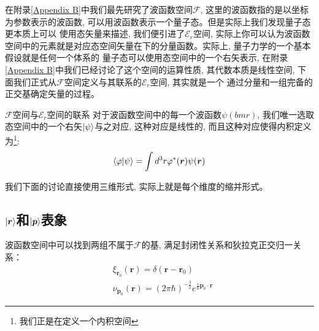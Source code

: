\documentclass[a4paper,zihao=-4,linespread=1]{ctexrep}
\begin{document}
    在附录\ref{Appendix B}中我们最先研究了波函数空间$\mathscr{F}$, 这里的波函数指的是以坐标为参数表示的波函数, 可以用波函数表示一个量子态。但是实际上我们发现量子态更本质上可以
    使用态矢量来描述, 我们便引进了$\mathscr{E}_r$空间, 实际上你可以认为波函数空间中的元素就是对应态空间矢量在下的分量函数。实际上, 量子力学的一个基本假设就是任何一个体系的
    量子态可以使用态空间中的一个右矢表示, 在附录\ref{Appendix B}中我们已经讨论了这个空间的运算性质, 其代数本质是线性空间, 下面我们正式从$\mathscr{F}$空间定义与其联系的$\mathscr {E}_r$空间, 其实就是一个
    通过分量和一组完备的正交基确定矢量的过程。
    \begin{proposition}{$\mathscr{F}$空间与$\mathscr {E}_r$空间的联系}
        对于波函数空间中的每一个波函数$\psi(bm{r})$, 我们唯一选取态空间中的一个右矢$\ket{\psi}$与之对应, 这种对应是线性的, 而且这种对应使得内积定义为\footnote{我们正是在定义一个内积空间}:
        \begin{equation}
            \label{eq:3.30}
            \braket{\varphi|\psi}=\int d^3r\varphi^*(\bm{r})\psi(\bm{r})
        \end{equation}
    \end{proposition}
    我们下面的讨论直接使用三维形式, 实际上就是每个维度的缩并形式。
    \subsection*{$\ket{\bm{r}}$和$\ket{\bm{p}}$表象}
    波函数空间中可以找到两组不属于$\mathscr{F}$的基, 满足封闭性关系和狄拉克正交归一关系：
    \begin{align}
        \label{eq:3.31}& \xi_{\bm{r}_0}(\bm{r})=\delta({\bm{r}-\bm{r}_0})\\
        \label{eq:3.32}& \nu_{\bm{p}_0}(\bm{r})=\left(2\pi\hbar\right)^{-\frac{3}{2}}e^{\frac{i}{\hbar}\bm{p}_0\cdot\bm{r}}
    \end{align}
    
\end{document}
